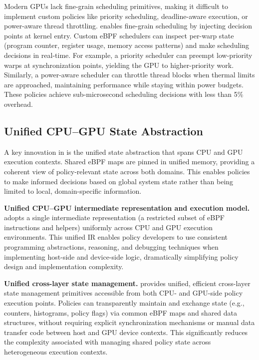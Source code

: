 \noindent Modern GPUs lack fine-grain scheduling primitives, making it difficult to implement custom policies like priority scheduling, deadline-aware execution, or power-aware thread throttling. \sys enables fine-grain scheduling by injecting decision points at kernel entry. Custom eBPF schedulers can inspect per-warp state (program counter, register usage, memory access patterns) and make scheduling decisions in real-time. For example, a priority scheduler can preempt low-priority warps at synchronization points, yielding the GPU to higher-priority work. Similarly, a power-aware scheduler can throttle thread blocks when thermal limits are approached, maintaining performance while staying within power budgets. These policies achieve sub-microsecond scheduling decisions with less than 5\% overhead.



\subsection{Unified CPU--GPU State Abstraction}

A key innovation in \sys is the unified state abstraction that spans CPU and GPU execution contexts. Shared eBPF maps are pinned in unified memory, providing a coherent view of policy-relevant state across both domains. This enables policies to make informed decisions based on global system state rather than being limited to local, domain-specific information.

\textbf{Unified CPU--GPU intermediate representation and execution model.}
\sys adopts a single intermediate representation (a restricted subset of eBPF instructions and helpers) uniformly across CPU and GPU execution environments. This unified IR enables policy developers to use consistent programming abstractions, reasoning, and debugging techniques when implementing host-side and device-side logic, dramatically simplifying policy design and implementation complexity.

\textbf{Unified cross-layer state management.}
\sys provides unified, efficient cross-layer state management primitives accessible from both CPU- and GPU-side policy execution points. Policies can transparently maintain and exchange state (e.g., counters, histograms, policy flags) via common eBPF maps and shared data structures, without requiring explicit synchronization mechanisms or manual data transfer code between host and GPU device contexts. This significantly reduces the complexity associated with managing shared policy state across heterogeneous execution contexts.

